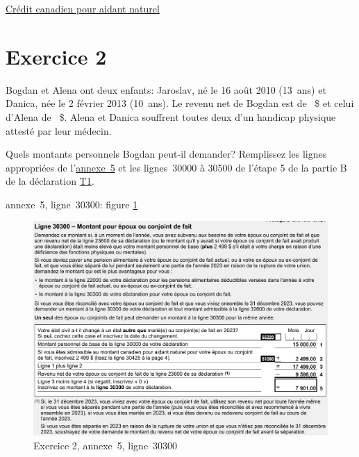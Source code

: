 \cat\href{https://www.canada.ca/fr/agence-revenu/services/impot/particuliers/sujets/tout-votre-declaration-revenus/declaration-revenus/remplir-declaration-revenus/deductions-credits-depenses/montant-aidants-naturels.html}{Crédit canadien pour aidant naturel}



\section{Exercice 2}
\setcounter{question}{0}
\begin{question}
	Bogdan et Alena ont deux enfants: Jaroslav, né le 16 août 2010 (13~ans) et Danica, née le 2 février 2013 (10~ans). Le revenu net de Bogdan est de ~\$ et celui d'Alena de ~\$. Alena et Danica souffrent toutes deux d'un handicap physique attesté par leur médecin.
	
	Quels montants personnels Bogdan peut-il demander? Remplissez les lignes appropriées de l'\href{https://www.canada.ca/fr/agence-revenu/services/formulaires-publications/trousses-impot-toutes-annees-imposition/trousse-generale-impot-prestations/5000-s5.html}{annexe~5} et les lignes~30000 à 30500 de l'étape 5 de la partie B de la déclaration \href{https://www.canada.ca/fr/agence-revenu/services/formulaires-publications/trousses-impot-toutes-annees-imposition/trousse-generale-impot-prestations/quebec/5005-r.html}{T1}.
\end{question}
annexe~5, ligne~30300: figure \ref{fig:chap4Exercice2Q130300}
\begin{figure}
	\centering
	\includegraphics[width=.9\textwidth]{exercice/4-2/Q1/30300.png}
	\caption[]{Exercice 2, annexe~5, ligne~30300}
	\label{fig:chap4Exercice2Q130300}
\end{figure}

